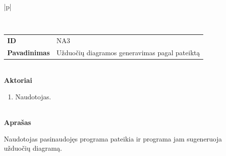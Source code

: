 \begin{center}
    \begin{longtable}{|p{\textwidth}|}
    \caption{Užduočių diagramos generavimo pagal pateiktą \DVCM{} modelį naudojimo atvejis}
	\label{tab:program_re_uc_generation}
	\\ \hline
    \begin{tabular}{@{}p{3.5cm}p{12cm}}
    	\\
    	\textbf{ID} & NA3
    	\\
    	\textbf{Pavadinimas} & Užduočių diagramos generavimas pagal pateiktą \DVCM{}
    	\\
    \end{tabular}
    \\
    \textbf{Aktoriai}
    \begin{enumerate}
    	\item Naudotojas.
	\end{enumerate}
    \\
    \textbf{Aprašas}

      Naudotojas pasinaudojęs programa pateikia \DVCM{} ir programa jam sugeneruoja užduočių diagramą.


\end{longtable}
\end{center}
